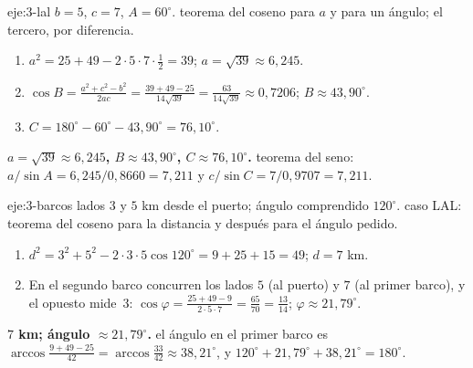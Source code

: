 \begin{solucion}{eje:3-lal}
\datos $b=5$, $c=7$, $A=60^{\circ}$.
\planteamiento teorema del coseno para $a$ y para un ángulo; el tercero, por diferencia.
\pasos
\begin{enumerate}[label=\arabic*.]
  \item $a^{2}=25+49-2\cdot5\cdot7\cdot\frac12=39$; $a=\sqrt{39}\approx6{,}245$.
  \item $\cos B=\frac{a^{2}+c^{2}-b^{2}}{2ac}=\frac{39+49-25}{14\sqrt{39}}=\frac{63}{14\sqrt{39}}\approx0{,}7206$; $B\approx43{,}90^{\circ}$.
  \item $C=180^{\circ}-60^{\circ}-43{,}90^{\circ}=76{,}10^{\circ}$.
\end{enumerate}
\resultado \textbf{$a=\sqrt{39}\approx6{,}245$, $B\approx43{,}90^{\circ}$, $C\approx76{,}10^{\circ}$.}
\comprobacion teorema del seno: $a/\sin A=6{,}245/0{,}8660=7{,}211$ y $c/\sin C=7/0{,}9707=7{,}211$.
\end{solucion}

\begin{solucion}{eje:3-barcos}
\datos lados $3$ y $5$ km desde el puerto; ángulo comprendido $120^{\circ}$.
\planteamiento caso LAL: teorema del coseno para la distancia y después para el ángulo pedido.
\pasos
\begin{enumerate}[label=\arabic*.]
  \item $d^{2}=3^{2}+5^{2}-2\cdot3\cdot5\cos120^{\circ}=9+25+15=49$; $d=7$ km.
  \item En el segundo barco concurren los lados $5$ (al puerto) y $7$ (al primer barco), y el opuesto mide~3: $\cos\varphi=\frac{25+49-9}{2\cdot5\cdot7}=\frac{65}{70}=\frac{13}{14}$; $\varphi\approx21{,}79^{\circ}$.
\end{enumerate}
\resultado \textbf{$7$ km; ángulo $\approx21{,}79^{\circ}$.}
\comprobacion el ángulo en el primer barco es $\arccos\frac{9+49-25}{42}=\arccos\frac{33}{42}\approx38{,}21^{\circ}$, y $120^{\circ}+21{,}79^{\circ}+38{,}21^{\circ}=180^{\circ}$.
\end{solucion}

